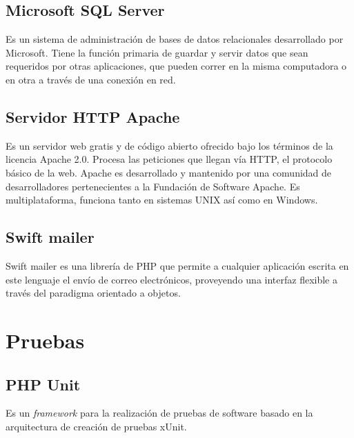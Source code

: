 \subsection{Microsoft SQL Server}

Es un sistema de administración de bases de datos relacionales desarrollado por Microsoft. Tiene la función primaria de guardar y servir datos que sean requeridos por otras aplicaciones, que pueden correr en la misma computadora o en otra a través de una conexión en red.

\subsection{Servidor HTTP Apache}

Es un servidor web gratis y de código abierto ofrecido bajo los términos de la licencia Apache 2.0. Procesa las peticiones que llegan vía HTTP, el protocolo básico de la web. Apache es desarrollado y mantenido por una comunidad de desarrolladores pertenecientes a la Fundación de Software Apache. Es multiplataforma, funciona tanto en sistemas UNIX así como en Windows.

\subsection{Swift mailer}
Swift mailer es una librería de PHP que permite a cualquier aplicación escrita en este lenguaje el envío de correo electrónicos, proveyendo una interfaz flexible a través del paradigma orientado a objetos.

\section{Pruebas}

\subsection{PHP Unit}

Es un \emph{framework} para la realización de pruebas de software basado en la arquitectura de creación de pruebas xUnit.




